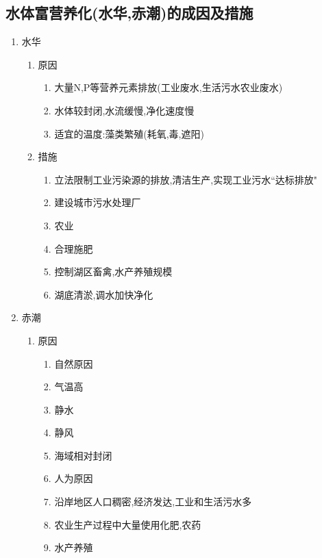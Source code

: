 \documentclass[a4paper]{article}
\begin{document}
    \subsection{水体富营养化(水华,赤潮)的成因及措施}
    \begin{enumerate}
        \item 水华
        \begin{enumerate}
            \item 原因
            \begin{enumerate}
                \item 大量N,P等营养元素排放(工业废水,生活污水农业废水)
                \item 水体较封闭,水流缓慢,净化速度慢
                \item 适宜的温度:藻类繁殖(耗氧,毒,遮阳)
            \end{enumerate}
            \item 措施
            \begin{enumerate}
                \item 立法限制工业污染源的排放,清洁生产,实现工业污水“达标排放"
                \item 建设城市污水处理厂
                \item 农业
                \item 合理施肥
                \item 控制湖区畜禽,水产养殖规模
                \item 湖底清淤,调水加快净化
            \end{enumerate}
        \end{enumerate}
        \item 赤潮
        \begin{enumerate}
            \item 原因
            \begin{enumerate}
                \item 自然原因
                    \item 气温高
                    \item 静水
                    \item 静风
                    \item 海域相对封闭
                \item 人为原因
                    \item 沿岸地区人口稠密,经济发达,工业和生活污水多
                    \item 农业生产过程中大量使用化肥,农药
                    \item 水产养殖

\end{enumerate}
\end{enumerate}
\end{enumerate}
\end{document}
